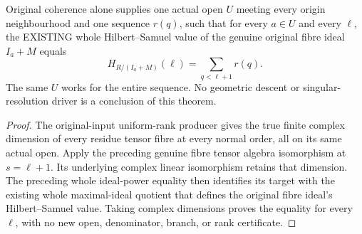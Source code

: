 \begin{theorem}
\label{hir:relative-normal-original-nearby-whole-fibre-hilbert-samuel}
\leanok
{}
Original coherence alone supplies one actual open $U$ meeting every origin
neighbourhood and one sequence $r(q)$, such that for every $a\in U$ and
every $\ell$, the EXISTING whole Hilbert--Samuel value of the genuine
original fibre ideal $I_a+M$ equals
\[
 H_{R/(I_a+M)}(\ell)=\sum_{q<\ell+1}r(q).
\]
The same $U$ works for the entire sequence. No geometric descent or
singular-resolution driver is a conclusion of this theorem.
\end{theorem}
\begin{proof}
The original-input uniform-rank producer gives the true finite complex
dimension of every residue tensor fibre at every normal order, all on
its same actual open. Apply the preceding genuine fibre tensor algebra
isomorphism at $s=\ell+1$. Its underlying complex linear isomorphism
retains that dimension. The preceding whole ideal-power equality then
identifies its target with the existing whole maximal-ideal quotient
that defines the original fibre ideal's Hilbert--Samuel value. Taking
complex dimensions proves the equality for every $\ell$, with no new
open, denominator, branch, or rank certificate.
\end{proof}
